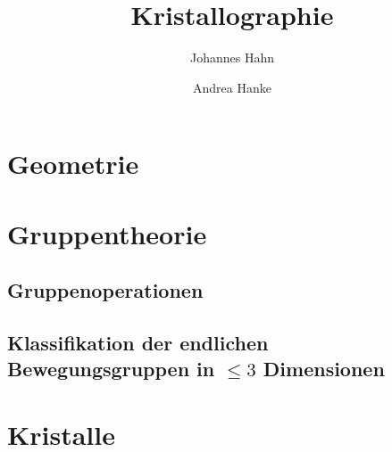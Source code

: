 \documentclass[fontsize=11pt,fleqn,a4paper]{scrartcl}
\title{Kristallographie}
\author{Johannes Hahn \and Andrea Hanke}
\begin{document}
\maketitle

\section{Geometrie}

\section{Gruppentheorie}

\subsection{Gruppenoperationen}

\subsection{Klassifikation der endlichen Bewegungsgruppen in $\leq 3$ Dimensionen}


\pagebreak
\section{Kristalle}

\end{document}
